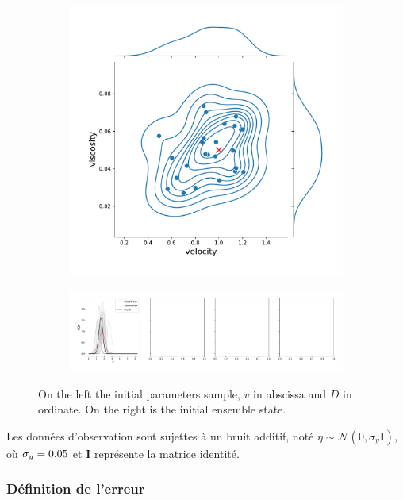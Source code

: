 \begin{figure}[ht!]
    \centering
    \begin{subfigure}{0.49\textwidth}
        \includegraphics[width=\textwidth]{images/app1d/param.pdf}
    \end{subfigure}
    \hfill
    \begin{subfigure}{0.49\textwidth}
        \includegraphics[width=\textwidth]{images/app1d/prior.pdf}
    \end{subfigure}
    \caption{On the left the initial parameters sample, $v$ in abscissa and $D$ in ordinate. On the right is the initial ensemble state.}
    \label{fig:initial_gen}
\end{figure}

Les données d'observation sont sujettes à un bruit additif, noté \(\eta \sim \mathcal{N}(0, \sigma_y \bm{I})\), où \(\sigma_y = 0.05\) et \(\bm{I}\) représente la matrice identité.

\subsubsection{Définition de l'erreur}

